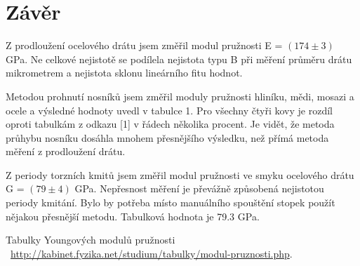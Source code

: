 \documentclass[a4paper,11pt]{article}
\begin{document}
\section{Závěr}

Z prodloužení ocelového drátu jsem změřil modul pružnosti E = $(174 \pm 3)$ GPa. Ne celkové nejistotě se podílela nejistota typu B při měření průměru drátu mikrometrem a nejistota sklonu lineárního fitu hodnot. 

Metodou prohnutí nosníků jsem změřil moduly pružnosti hliníku, mědi, mosazi a ocele a výsledné hodnoty uvedl v tabulce 1. Pro všechny čtyři kovy je rozdíl oproti tabulkám z odkazu [1] v řádech několika procent. Je vidět, že metoda průhybu nosníku dosáhla mnohem přesnějšího výsledku, než přímá metoda měření z prodloužení drátu.

Z periody torzních kmitů jsem změřil modul pružnosti ve smyku ocelového drátu G = $(79 \pm 4)$ GPa. Nepřesnost měření je převážně způsobená nejistotou periody kmitání. Bylo by potřeba místo manuálního spouštění stopek použít nějakou přesnější metodu. Tabulková hodnota je 79.3 GPa.

\begin{thebibliography}{0}
 Tabulky Youngových modulů pružnosti ~\url{http://kabinet.fyzika.net/studium/tabulky/modul-pruznosti.php}.   
\end{thebibliography}
\end{document}
